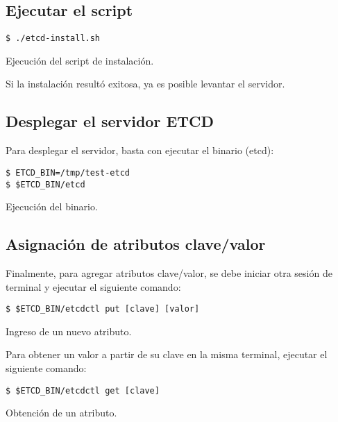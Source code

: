 \documentclass[11pt]{scrartcl} %
\begin{document}
\subsection{Ejecutar el script}

\begin{listing}[H]
	\begin{verbatim}
$ ./etcd-install.sh
	\end{verbatim}
	\caption{Ejecución del script de instalación.}
	\label{lst:installation}
\end{listing}

Si la instalación resultó exitosa, ya es posible levantar el servidor.

\subsection{Desplegar el servidor ETCD}

Para desplegar el servidor, basta con ejecutar el binario (etcd):

\begin{listing}[H]
	\begin{verbatim}
$ ETCD_BIN=/tmp/test-etcd
$ $ETCD_BIN/etcd
	\end{verbatim}
	\caption{Ejecución del binario.}
	\label{lst:execution}
\end{listing}

\subsection{Asignación de atributos clave/valor}

Finalmente, para agregar atributos clave/valor, se debe iniciar otra sesión de terminal y ejecutar el siguiente comando:

\begin{listing}[H]
	\begin{verbatim}
$ $ETCD_BIN/etcdctl put [clave] [valor]
	\end{verbatim}
	\caption{Ingreso de un nuevo atributo.}
	\label{lst:input}
\end{listing}

Para obtener un valor a partir de su clave en la misma terminal, ejecutar el siguiente comando:

\begin{listing}[H]
	\begin{verbatim}
$ $ETCD_BIN/etcdctl get [clave]
	\end{verbatim}
	\caption{Obtención de un atributo.}
	\label{lst:output}
\end{listing}
\end{document}
